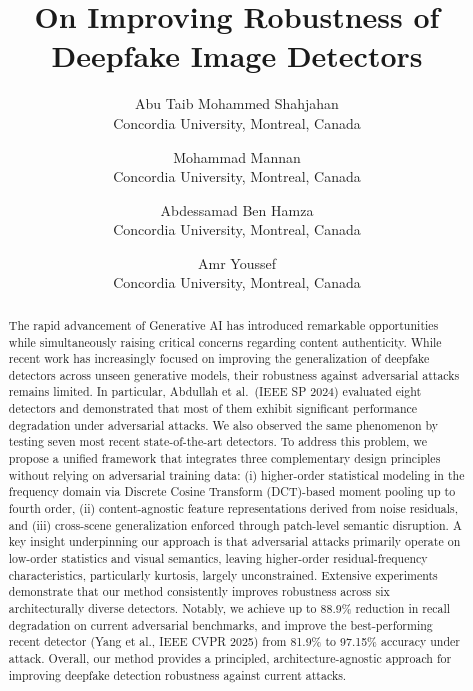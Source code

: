 \documentclass[letterpaper,twocolumn,10pt]{article}
\begin{document}

\date{}

\title{\Large \bf On Improving Robustness of Deepfake  Image Detectors}

 \author{
 {\rm Abu Taib Mohammed Shahjahan}\\
 Concordia University, Montreal, Canada
 \and
 {\rm Mohammad Mannan}\\
 Concordia University, Montreal, Canada
 \and
 {\rm Abdessamad Ben Hamza}\\
 Concordia University, Montreal, Canada
 \and
 {\rm Amr Youssef}\\
 Concordia University, Montreal, Canada
 }
\pagestyle{empty}

\maketitle

\begin{abstract}
The rapid advancement of Generative AI has introduced remarkable opportunities while simultaneously raising critical concerns regarding content authenticity. While recent work has increasingly focused on improving the generalization of deepfake detectors across unseen generative models, their robustness against adversarial attacks remains limited. In particular, Abdullah et al.\ (IEEE SP 2024) evaluated eight detectors and demonstrated that most of them exhibit significant performance degradation under adversarial attacks. We also observed the same phenomenon by testing seven most recent state-of-the-art  detectors.  
To address this problem, we propose a unified framework that integrates three complementary design principles without relying on adversarial training data: (i) higher-order statistical modeling in the frequency domain via Discrete Cosine Transform (DCT)-based moment pooling up to fourth order, (ii) content-agnostic feature representations derived from noise residuals, and (iii) cross-scene generalization enforced through patch-level semantic disruption. A key insight underpinning our approach is that adversarial attacks primarily operate on low-order statistics and visual semantics, leaving higher-order residual-frequency characteristics, particularly kurtosis, largely unconstrained. Extensive experiments demonstrate that our method consistently improves robustness across six architecturally diverse detectors. Notably, we achieve up to 88.9\% reduction in recall degradation on current adversarial benchmarks, and improve the best-performing recent detector (Yang et al., IEEE CVPR 2025) from 81.9\% to 97.15\% accuracy under attack. Overall, our method provides a principled, architecture-agnostic approach for improving deepfake detection robustness against current attacks.

\end{abstract}
\end{document}
